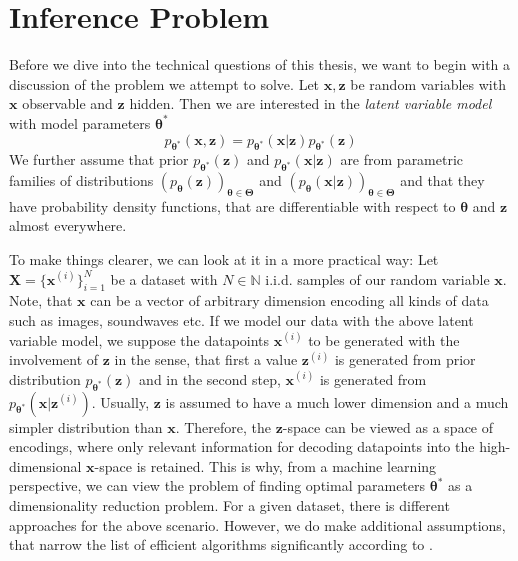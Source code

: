 \documentclass[12pt]{report}
\theoremstyle{definition}
\begin{document}
\section{Inference Problem}
Before we dive into the technical questions of this thesis, we want to begin with a discussion of the problem we attempt to solve. Let $\mathbf{x}, \mathbf{z}$ be random variables with $\mathbf{x}$ observable and $\mathbf{z}$ hidden. Then we are interested in the \textit{latent variable model} with model parameters $\pmb{\theta}^*$
\begin{equation}
	p_{\pmb{\theta}^*}(\mathbf{x}, \mathbf{z}) = p_{\pmb{\theta}^*}(\mathbf{x}| \mathbf{z})p_{\pmb{\theta}^*}(\mathbf{z})
\end{equation}
We further assume that prior $p_{\pmb{\theta}^*}(\mathbf{z})$ and $p_{\pmb{\theta}^*}(\mathbf{x}|\mathbf{z})$ are from parametric families of distributions $(p_{\pmb{\theta}}(\mathbf{z}))_{\pmb{\theta} \in \pmb{\Theta}}$ and $(p_{\pmb{\theta}}(\mathbf{x}|\mathbf{z}))_{\pmb{\theta} \in \pmb{\Theta}}$ and that they have probability density functions, that are differentiable with respect to $\pmb{\theta}$ and $\mathbf{z}$ almost everywhere.

To make things clearer, we can look at it in a more practical way: Let $\mathbf{X} = \{ \mathbf{x}^{(i)}\}_{i=1}^N$ be a dataset with $N \in \mathbb{N}$ i.i.d. samples of our random variable $\mathbf{x}$. Note, that $\mathbf{x}$ can be a vector of arbitrary dimension encoding all kinds of data such as images, soundwaves etc. If we model our data with the above latent variable model, we suppose the datapoints $\mathbf{x}^{(i)}$ to be generated with the involvement of $\mathbf{z}$ in the sense, that first a value $\mathbf{z}^{(i)}$ is generated from prior distribution $p_{\mathbf{\theta^*}}(\mathbf{z})$ and in the second step, $\mathbf{x}^{(i)}$ is generated from $p_{\pmb{\theta}^*}(\mathbf{x}|\mathbf{z}^{(i)})$.
Usually, $\mathbf{z}$ is assumed to have a much lower dimension and a much simpler distribution than $\mathbf{x}$. Therefore, the $\mathbf{z}$-space can be viewed as a space of encodings, where only relevant information for decoding datapoints into the high-dimensional $\mathbf{x}$-space is retained. This is why, from a machine learning perspective, we can view the problem of finding optimal parameters $\pmb{\theta}^*$ as a dimensionality reduction problem.
For a given dataset, there is different approaches for the above scenario. However, we do make additional assumptions, that narrow the list of efficient algorithms significantly according to \cite{kingma1}.
\end{document}
